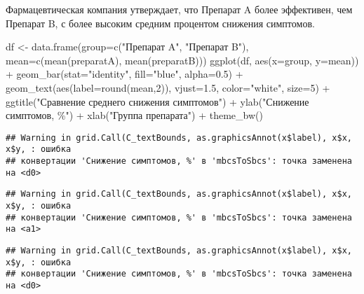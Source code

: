 \documentclass[
]{article}
\newenvironment{Shaded}{\begin{snugshade}}{\end{snugshade}}
\newcommand{\AttributeTok}[1]{\textcolor[rgb]{0.77,0.63,0.00}{#1}}
\newcommand{\DecValTok}[1]{\textcolor[rgb]{0.00,0.00,0.81}{#1}}
\newcommand{\FloatTok}[1]{\textcolor[rgb]{0.00,0.00,0.81}{#1}}
\newcommand{\FunctionTok}[1]{\textcolor[rgb]{0.00,0.00,0.00}{#1}}
\newcommand{\NormalTok}[1]{#1}
\newcommand{\OtherTok}[1]{\textcolor[rgb]{0.56,0.35,0.01}{#1}}
\newcommand{\SpecialCharTok}[1]{\textcolor[rgb]{0.00,0.00,0.00}{#1}}
\newcommand{\StringTok}[1]{\textcolor[rgb]{0.31,0.60,0.02}{#1}}
\begin{document}
Фармацевтическая компания утверждает, что Препарат A более эффективен,
чем Препарат B, с более высоким средним процентом снижения симптомов.

\begin{Shaded}
\begin{Highlighting}[]
\NormalTok{df }\OtherTok{\textless{}{-}} \FunctionTok{data.frame}\NormalTok{(}\AttributeTok{group=}\FunctionTok{c}\NormalTok{(}\StringTok{"Препарат A"}\NormalTok{, }\StringTok{"Препарат B"}\NormalTok{), }\AttributeTok{mean=}\FunctionTok{c}\NormalTok{(}\FunctionTok{mean}\NormalTok{(preparatA), }\FunctionTok{mean}\NormalTok{(preparatB)))}
\FunctionTok{ggplot}\NormalTok{(df, }\FunctionTok{aes}\NormalTok{(}\AttributeTok{x=}\NormalTok{group, }\AttributeTok{y=}\NormalTok{mean)) }\SpecialCharTok{+}
  \FunctionTok{geom\_bar}\NormalTok{(}\AttributeTok{stat=}\StringTok{"identity"}\NormalTok{, }\AttributeTok{fill=}\StringTok{"blue"}\NormalTok{, }\AttributeTok{alpha=}\FloatTok{0.5}\NormalTok{) }\SpecialCharTok{+}
  \FunctionTok{geom\_text}\NormalTok{(}\FunctionTok{aes}\NormalTok{(}\AttributeTok{label=}\FunctionTok{round}\NormalTok{(mean,}\DecValTok{2}\NormalTok{)), }\AttributeTok{vjust=}\FloatTok{1.5}\NormalTok{, }\AttributeTok{color=}\StringTok{"white"}\NormalTok{, }\AttributeTok{size=}\DecValTok{5}\NormalTok{) }\SpecialCharTok{+}
  \FunctionTok{ggtitle}\NormalTok{(}\StringTok{"Сравнение среднего снижения симптомов"}\NormalTok{) }\SpecialCharTok{+}
  \FunctionTok{ylab}\NormalTok{(}\StringTok{"Снижение симптомов, \%"}\NormalTok{) }\SpecialCharTok{+}
  \FunctionTok{xlab}\NormalTok{(}\StringTok{"Группа препарата"}\NormalTok{) }\SpecialCharTok{+}
  \FunctionTok{theme\_bw}\NormalTok{()}
\end{Highlighting}
\end{Shaded}

\begin{verbatim}
## Warning in grid.Call(C_textBounds, as.graphicsAnnot(x$label), x$x, x$y, : ошибка
## конвертации 'Снижение симптомов, %' в 'mbcsToSbcs': точка заменена на <d0>
\end{verbatim}

\begin{verbatim}
## Warning in grid.Call(C_textBounds, as.graphicsAnnot(x$label), x$x, x$y, : ошибка
## конвертации 'Снижение симптомов, %' в 'mbcsToSbcs': точка заменена на <a1>
\end{verbatim}

\begin{verbatim}
## Warning in grid.Call(C_textBounds, as.graphicsAnnot(x$label), x$x, x$y, : ошибка
## конвертации 'Снижение симптомов, %' в 'mbcsToSbcs': точка заменена на <d0>
\end{verbatim}
\end{document}

